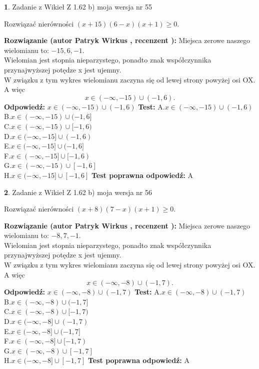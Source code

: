 \documentclass[12pt, a4paper]{article}
\theoremstyle{definition} %
\newtheorem{zad}{}
\newcommand{\zadStart}[1]{\begin{zad}#1\newline}
\newcommand{\zadStop}{\end{zad}}
\newcommand{\rozwStart}[2]{\noindent \textbf{Rozwiązanie (autor #1 , recenzent #2): }\newline}
\newcommand{\rozwStop}{\newline}
\newcommand{\odpStart}{\noindent \textbf{Odpowiedź:}\newline}
\newcommand{\odpStop}{\newline}
\newcommand{\testStart}{\noindent \textbf{Test:}\newline}
\newcommand{\testStop}{\newline}
\newcommand{\kluczStart}{\noindent \textbf{Test poprawna odpowiedź:}\newline}
\newcommand{\kluczStop}{\newline}
\begin{document}
\zadStart{Zadanie z Wikieł Z 1.62 b) moja wersja nr 55}

Rozwiązać nierówności $(x+15)(6-x)(x+1)\ge0$.
\zadStop
\rozwStart{Patryk Wirkus}{}
Miejsca zerowe naszego wielomianu to: $-15, 6, -1$.\\
Wielomian jest stopnia nieparzystego, ponadto znak współczynnika przy\linebreak najwyższej potędze x jest ujemny.\\ W związku z tym wykres wielomianu zaczyna się od lewej strony powyżej osi OX. A więc $$x \in (-\infty,-15) \cup (-1,6).$$
\rozwStop
\odpStart
$x \in (-\infty,-15) \cup (-1,6)$
\odpStop
\testStart
A.$x \in (-\infty,-15) \cup (-1,6)$\\
B.$x \in (-\infty,-15) \cup (-1,6]$\\
C.$x \in (-\infty,-15) \cup [-1,6)$\\
D.$x \in (-\infty,-15] \cup (-1,6)$\\
E.$x \in (-\infty,-15] \cup (-1,6]$\\
F.$x \in (-\infty,-15] \cup [-1,6)$\\
G.$x \in (-\infty,-15) \cup [-1,6]$\\
H.$x \in (-\infty,-15] \cup [-1,6]$
\testStop
\kluczStart
A
\kluczStop



\zadStart{Zadanie z Wikieł Z 1.62 b) moja wersja nr 56}

Rozwiązać nierówności $(x+8)(7-x)(x+1)\ge0$.
\zadStop
\rozwStart{Patryk Wirkus}{}
Miejsca zerowe naszego wielomianu to: $-8, 7, -1$.\\
Wielomian jest stopnia nieparzystego, ponadto znak współczynnika przy\linebreak najwyższej potędze x jest ujemny.\\ W związku z tym wykres wielomianu zaczyna się od lewej strony powyżej osi OX. A więc $$x \in (-\infty,-8) \cup (-1,7).$$
\rozwStop
\odpStart
$x \in (-\infty,-8) \cup (-1,7)$
\odpStop
\testStart
A.$x \in (-\infty,-8) \cup (-1,7)$\\
B.$x \in (-\infty,-8) \cup (-1,7]$\\
C.$x \in (-\infty,-8) \cup [-1,7)$\\
D.$x \in (-\infty,-8] \cup (-1,7)$\\
E.$x \in (-\infty,-8] \cup (-1,7]$\\
F.$x \in (-\infty,-8] \cup [-1,7)$\\
G.$x \in (-\infty,-8) \cup [-1,7]$\\
H.$x \in (-\infty,-8] \cup [-1,7]$
\testStop
\kluczStart
A
\kluczStop
\end{document}
